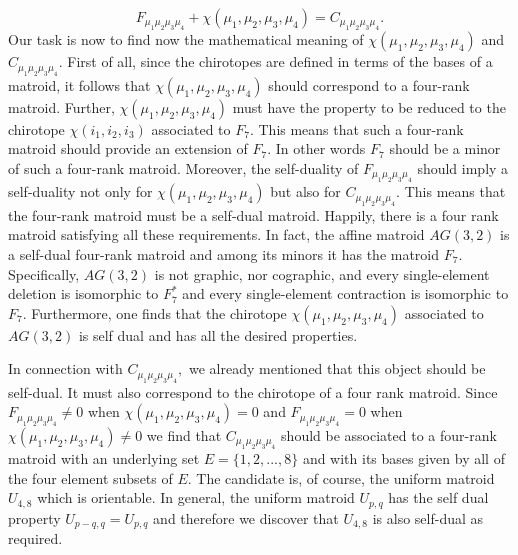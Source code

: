 \documentclass[a4paper,12pt]{article}
\begin{document}
\begin{equation}
F_{\mu _{1}\mu _{2}\mu _{3}\mu _{4}}+\chi (\mu _{1},\mu _{2},\mu _{3},\mu
_{4})=C_{\mu _{1}\mu _{2}\mu _{3}\mu _{4}}.  \label{22}
\end{equation}
Our task is now to find now the mathematical meaning of $\chi (\mu _{1},\mu
_{2},\mu _{3},\mu _{4})$ and $C_{\mu _{1}\mu _{2}\mu _{3}\mu _{4}}.$ First
of all, since the chirotopes are defined in terms of the bases of a matroid,
it follows that $\chi (\mu _{1},\mu _{2},\mu _{3},\mu _{4})$ should
correspond to a four-rank matroid. Further, $\chi (\mu _{1},\mu _{2},\mu
_{3},\mu _{4})$ must have the property to be reduced to the chirotope $\chi
(i_{1},i_{2},i_{3})$ associated to $F_{7}.$ This means that such a four-rank
matroid should provide an extension of $F_{7}.$ In other words $F_{7}$
should be a minor of such a four-rank matroid. Moreover, the self-duality of 
$F_{\mu _{1}\mu _{2}\mu _{3}\mu _{4}}$ should imply a self-duality not only
for $\chi (\mu _{1},\mu _{2},\mu _{3},\mu _{4})$ but also for $C_{\mu
_{1}\mu _{2}\mu _{3}\mu _{4}}$. This means that the four-rank matroid must
be a self-dual matroid. Happily, there is a four rank matroid satisfying all
these requirements. In fact, the affine matroid $AG(3,2)$ is a self-dual
four-rank matroid and among its minors it has the matroid $F_{7}.$
Specifically, $AG(3,2)$ is not graphic, nor cographic, and every
single-element deletion is isomorphic to $F_{7}^{\ast }$ and every
single-element contraction is isomorphic to $F_{7}$. Furthermore, one finds
that the chirotope $\chi (\mu _{1},\mu _{2},\mu _{3},\mu _{4})$ associated
to $AG(3,2)$ is self dual and has all the desired properties.

In connection with $C_{\mu _{1}\mu _{2}\mu _{3}\mu _{4}},$ we already
mentioned that this object should be self-dual. It must also correspond to
the chirotope of a four rank matroid. Since $F_{\mu _{1}\mu _{2}\mu _{3}\mu
_{4}}\neq 0$ when $\chi (\mu _{1},\mu _{2},\mu _{3},\mu _{4})=0$ and $F_{\mu
_{1}\mu _{2}\mu _{3}\mu _{4}}=0$ when $\chi (\mu _{1},\mu _{2},\mu _{3},\mu
_{4})\neq 0$ we find that $C_{\mu _{1}\mu _{2}\mu _{3}\mu _{4}}$ should be
associated to a four-rank matroid with an underlying set $E=\{1,2,...,8\}$
and with its bases given by all of the four element subsets of $E$. The
candidate is, of course, the uniform matroid $U_{4,8}$ which is orientable$.$
In general, the uniform matroid $U_{p,q}$ has the self dual property $%
U_{p-q,q}=U_{p,q}$ and therefore we discover that $U_{4,8}$ is also
self-dual as required.
\end{document}
